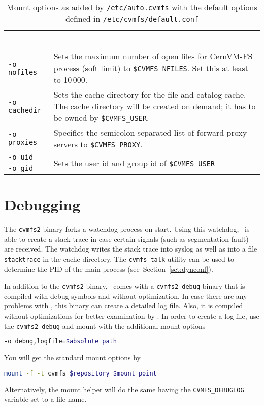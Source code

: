 \begin{table}
\begin{center}
\begin{tabularx}{\linewidth}{lX}
			 & \\
			 & \\
			 & \\
			 & \\
			 & \\
			 & \\
			\lstinline{-o nofiles} & Sets the maximum number of open files for CernVM-FS process (soft limit) to \texttt{\$CVMFS\_NFILES}.  Set this at least to 10\,000. \\
			\lstinline{-o cachedir} & Sets the cache directory for the file and catalog cache. The cache directory will be created on demand; it has to be owned by \texttt{\$CVMFS\_USER}. \\
			\lstinline{-o proxies} & Specifies the semicolon-separated list of forward proxy servers to \texttt{\$CVMFS\_PROXY}. \\
			\lstinline{-o uid} & \multirow{2}{\linewidth}{Sets the user id and group id of \texttt{\$CVMFS\_USER}} \\
			\lstinline{-o gid} & \\
		\end{tabularx}
	\end{center}
	\caption{Mount options as added by \texttt{/etc/auto.cvmfs} with the default options defined in \texttt{/etc/cvmfs/default.conf}}
	\label{tbl:stdoptions}
\end{table}

\section{Debugging}
The \texttt{cvmfs2} binary forks a watchdog process on start.
Using this watchdog, \cvmfs\ is able to create a stack trace in case certain signals (such as segmentation fault) are received.
The watchdog writes the stack trace into syslog as well as into a file \texttt{stacktrace} in the cache directory.
The \texttt{cvmfs-talk} utility can be used to determine the PID of the main process (see~Section~\ref{sct:dynconf}).

In addition to the \texttt{cvmfs2} binary, \cvmfs\ comes with a \texttt{cvmfs2\_debug} binary that is compiled with debug symbols and without optimization.
In case there are any problems with \cvmfs, this binary can create a detailed log file.
Also, it is compiled without optimizations for better examination by .
In order to create a log file, use the  \texttt{cvmfs2\_debug} and mount with the additional mount options
\begin{lstlisting}[language=bash]
-o debug,logfile=$absolute_path
\end{lstlisting}
You will get the standard mount options by
\begin{lstlisting}[language=bash]
mount -f -t cvmfs $repository $mount_point
\end{lstlisting}
Alternatively, the mount helper will do the same having the \texttt{CVMFS\_DEBUGLOG} variable set to a file name.

